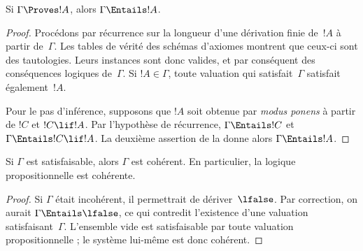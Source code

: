 \documentclass[../../../include/open-logic-section]{subfiles}
\begin{document}


\begin{thm}[Correction]
Si $\Gamma\Proves !A$, alors
$\Gamma\Entails !A$.
\end{thm}

\begin{proof}
Procédons par récurrence sur la longueur d'une
dérivation finie de~$!A$ à partir de~$\Gamma$.
Les tables de vérité des schémas d'axiomes montrent
que ceux-ci sont des tautologies. Leurs instances
sont donc valides, et par conséquent des conséquences
logiques de~$\Gamma$. Si $!A\in\Gamma$,
toute valuation qui satisfait~$\Gamma$ satisfait
également~$!A$.

Pour le pas d'inférence, supposons que $!A$ soit
obtenue par \emph{modus ponens} à partir de
$!C$ et $!C\lif !A$. Par l'hypothèse de
récurrence, $\Gamma\Entails !C$ et
$\Gamma\Entails !C\lif !A$. La deuxième
assertion de la
donne alors $\Gamma\Entails !A$.
\end{proof}

\begin{cor}
Si $\Gamma$ est satisfaisable, alors $\Gamma$
est cohérent. En particulier, la logique
propositionnelle est cohérente.
\end{cor}

\begin{proof}
Si $\Gamma$ était incohérent, il permettrait
de dériver~$\lfalse$. Par correction,
on aurait $\Gamma\Entails\lfalse$, ce qui
contredit l'existence d'une valuation
satisfaisant~$\Gamma$. L'ensemble vide est
satisfaisable par toute valuation propositionnelle ;
le système lui-même est donc cohérent.
\end{proof}
\end{document}
